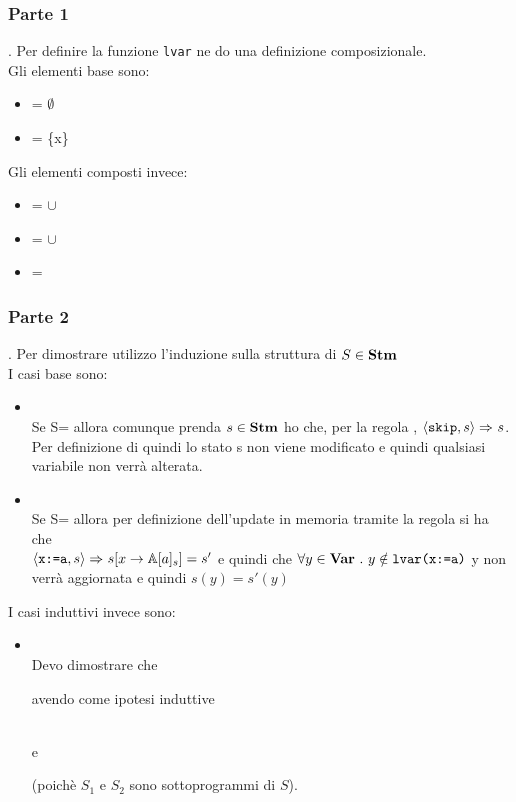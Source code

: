 {
	\subsubsection{Parte 1}.
	Per definire la funzione \texttt{lvar} ne do una definizione
	composizionale. \\
	Gli elementi base sono:
	\begin{itemize}
	\item \lvar{\skipistr} = $\emptyset$
	\item {} = \{x\}
	\end{itemize}
	Gli elementi composti invece:
	\begin{itemize}
	\item {} =  $\cup$ 
	\item {} =  $\cup$ 
	\item {} = 
	\end{itemize}

	\subsubsection{Parte 2}. Per dimostrare \exTwo{} utilizzo l'induzione sulla
	struttura di $S\in\mbox{\textbf{Stm}}$ \\
	
	I casi base sono:
	\begin{itemize}
	\item {}
	\casespace
	\\
	Se S=\skipistr{} allora comunque prenda 
	$s\in\mbox{\textbf{Stm}}$ ho che, per la regola \skipSOS{}, $\langle{}\textrm{\normalfont{\texttt{skip}}}, s\rangle{}\Rightarrow^{}s$.
	Per definizione di \skipistr{} quindi lo stato s non viene modificato e
	quindi qualsiasi variabile non verrà alterata.

	\item {}
	\casespace
	\\
	 Se S= allora per definizione dell'update in memoria
	tramite la regola \assSOS{} si ha che \\
	$\langle{}\textrm{\normalfont{\texttt{x:=a}}}, s\rangle{}\Rightarrow^{}s[x\rightarrow\mathbb{A}[a]_s]=s'$ e
	quindi che $\forall{}y\in\mbox{\textbf{Var}}~.~y\notin\textrm{\normalfont{\texttt{lvar(\textrm{\normalfont{\texttt{x:=a}}})}}}$ y non verrà
	aggiornata e quindi $s(y)=s'(y)$
	\end{itemize}


	I casi induttivi invece sono:
	\begin{itemize}
	\item {}
    \casespace
	\\
	Devo dimostrare che 
	\begin{center}
	\end{center}
	avendo come ipotesi induttive
	\begin{center}		
	 \\
	e\\
	\end{center}
	(poichè $S_1$ e $S_2$ sono sottoprogrammi di $S$). 
	

\end{itemize}}
